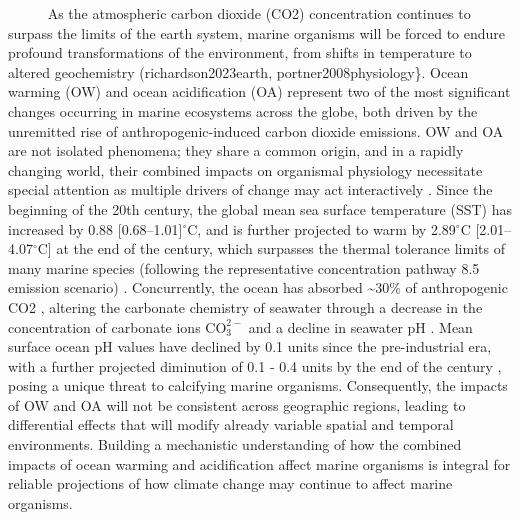 \documentclass[
  12pt,
]{article}
\begin{document}
~~~~~ As the atmospheric carbon dioxide (CO2) concentration continues to
surpass the limits of the earth system, marine organisms will be forced
to endure profound transformations of the environment, from shifts in
temperature to altered geochemistry (richardson2023earth,
portner2008physiology\}. Ocean warming (OW) and ocean acidification (OA)
represent two of the most significant changes occurring in marine
ecosystems across the globe, both driven by the unremitted rise of
anthropogenic-induced carbon dioxide emissions. OW and OA are not
isolated phenomena; they share a common origin, and in a rapidly
changing world, their combined impacts on organismal physiology
necessitate special attention as multiple drivers of change may act
interactively \citep{cote2016interactions}. Since the beginning of the
20th century, the global mean sea surface temperature (SST) has
increased by 0.88 {[}0.68--1.01{]}\(^\circ\)C, and is further projected
to warm by 2.89\(^\circ\)C {[}2.01--4.07\(^\circ\)C{]} at the end of the
century, which surpasses the thermal tolerance limits of many marine
species (following the representative concentration pathway 8.5 emission
scenario)
\citep{kikstra2022ipcc, fox2021ocean, bay2017genomic, somero2010physiology}.
Concurrently, the ocean has absorbed \textasciitilde30\% of
anthropogenic CO2 \citep{feely2004impact}, altering the carbonate
chemistry of seawater through a decrease in the concentration of
carbonate ions \(\mathrm{CO_3^{2-}}\) and a decline in seawater pH
\citep{feely2004impact}. Mean surface ocean pH values have declined by
0.1 units since the pre-industrial era, with a further projected
diminution of 0.1 - 0.4 units by the end of the century
\citep{change2014impacts, orr2005anthropogenic}, posing a unique threat
to calcifying marine organisms. Consequently, the impacts of OW and OA
will not be consistent across geographic regions, leading to
differential effects that will modify already variable spatial and
temporal environments. Building a mechanistic understanding of how the
combined impacts of ocean warming and acidification affect marine
organisms is integral for reliable projections of how climate change may
continue to affect marine organisms.
\end{document}
